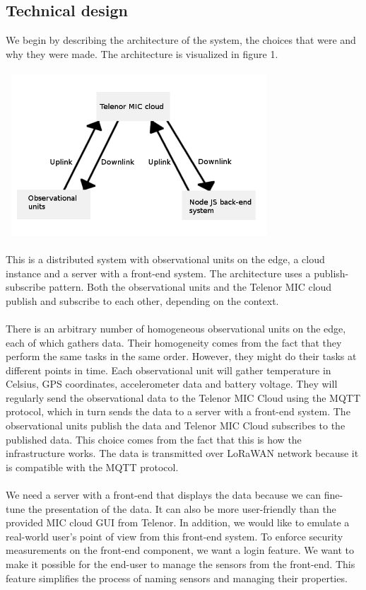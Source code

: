 	\subsection{Technical design}
		We begin by describing the architecture of the system, the choices that were and why they were made. The architecture is visualized in figure 1.
		\\\\
		\includegraphics[width=10cm, height=6cm]{images/figure1}
		\\\\
		This is a distributed system with observational units on the edge, a cloud instance and a server with a front-end system. The architecture uses a publish-subscribe pattern. Both the observational units and the Telenor MIC cloud publish and subscribe to each other, depending on the context.
		\\\\
		There is an arbitrary number of homogeneous observational units on the edge, each of which gathers data. Their homogeneity comes from the fact that they perform the same tasks in the same order. However, they might do their tasks at different points in time. Each observational unit will gather temperature in Celsius, GPS coordinates, accelerometer data and battery voltage. They will regularly send the observational data to the Telenor MIC Cloud using the MQTT protocol, which in turn sends the data to a server with a front-end system. The observational units publish the data and Telenor MIC Cloud subscribes to the published data. This choice comes from the fact that this is how the infrastructure works. The data is transmitted over LoRaWAN network because it is compatible with the MQTT protocol. 
		\\\\
		We need a server with a front-end that displays the data because we can fine-tune the presentation of the data. It can also be more user-friendly than the provided MIC cloud GUI from Telenor. In addition, we would like to emulate a real-world user’s point of view from this front-end system. To enforce security measurements on the front-end component, we want a login feature. We want to make it possible for the end-user to manage the sensors from the front-end. This feature simplifies the process of naming sensors and managing their properties. 	
